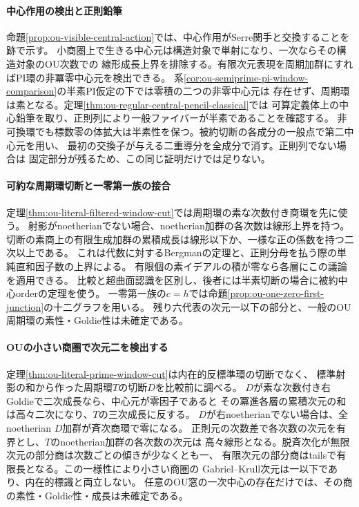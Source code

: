 \documentclass[11pt,a4paper]{ltjsarticle}
\begin{document}
\paragraph{中心作用の検出と正則鉛筆}
命題\ref{prop:ou-visible-central-action}では、中心作用がSerre関手と交換することを跡で示す。
小商圏上で生きる中心元は構造対象で単射になり、一次ならその構造対象のOU次数での
線形成長上界を排除する。有限次元表現を周期加群にすればPI環の非冪零中心元を検出できる。
系\ref{cor:ou-semiprime-pi-window-comparison}の半素PI仮定の下では零積の二つの非零中心元は
存在せず、周期環は素となる。定理\ref{thm:ou-regular-central-pencil-classical}では
可算定義体上の中心鉛筆を取り、正則列により一般ファイバーが半素であることを確認する。
非可換環でも標数零の体拡大は半素性を保つ。被約切断の各成分の一般点で第二中心元を用い、
最初の交換子が与える二重導分を全成分で消す。正則列でない場合は
固定部分が残るため、この同じ証明だけでは足りない。

\paragraph{可約な周期環切断と一零第一族の接合}
定理\ref{thm:ou-literal-filtered-window-cut}では周期環の素な次数付き商環を先に使う。
射影がnoetherianでない場合、noetherian加群の各次数は線形上界を持つ。
切断の素商上の有限生成加群の累積成長は線形以下か、一様な正の係数を持つ二次以上である。
これは代数に対するBergmanの定理と、正則分母を払う際の単純直和因子数の上界による。
有限個の素イデアルの積が零なら各層にこの議論を適用できる。
比較と超曲面認識を区別し、後者には半素切断の場合に被約中心orderの定理を使う。
一零第一族の$c=h$では命題\ref{prop:ou-one-zero-first-junction}の十二グラフを用いる。
残り六代表の次元一以下の部分と、一般のOU周期環の素性・Goldie性は未確定である。

\paragraph{OUの小さい商圏で次元二を検出する}
定理\ref{thm:ou-literal-prime-window-cut}は内在的反標準環の切断でなく、
標準射影の和から作った周期環$T$の切断$D$を比較前に調べる。
$D$が素な次数付き右Goldieで二次成長なら、中心元が零因子であると
その冪進各層の累積次元の和は高々二次になり、$T$の三次成長に反する。
$D$が右noetherianでない場合は、全noetherian $D$加群が斉次商環で零になる。
正則元の次数差で各次数の次元を有界とし、$T$のnoetherian加群の各次数の次元は
高々線形となる。脱斉次化が無限次元の部分商は次数ごとの傾きが少なくとも一、
有限次元の部分商はtailsで有限長となる。この一様性により小さい商圏の
Gabriel--Krull次元は一以下であり、内在的標識と両立しない。
任意のOU窓の一次中心の存在だけでは、その商の素性・Goldie性・成長は未確定である。
\end{document}
